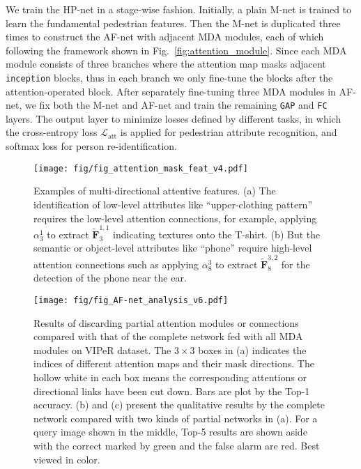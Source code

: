 \documentclass[10pt,twocolumn,letterpaper]{article}
\begin{document}
We train the HP-net in a stage-wise fashion.
Initially, a plain M-net is trained to learn the fundamental pedestrian features.
Then the M-net is duplicated three times to construct the AF-net with adjacent MDA modules, each of which following the framework shown in Fig.~\ref{fig:attention_module}.
Since each MDA module consists of three branches where the attention map masks adjacent \texttt{inception} blocks, thus in each branch we only fine-tune the blocks after the attention-operated block.
After separately fine-tuning three MDA modules in AF-net, we fix both the M-net and AF-net and train the remaining \texttt{GAP} and \texttt{FC} layers.
The output layer to minimize losses defined by different tasks, in which the cross-entropy loss $\mathcal{L}_\text{att}$ is applied for pedestrian attribute recognition, and softmax loss for person re-identification.






\begin{figure}[t]
\centering
\texttt{[image: fig/fig\_attention\_mask\_feat\_v4.pdf]}
\caption{
Examples of multi-directional attentive features.
(a) The identification of low-level attributes like ``upper-clothing pattern'' requires the low-level attention connections, for example, applying $\alpha^1_3$ to extract $\tilde{\mathbf{F}}^{1,1}_3$ indicating textures onto the T-shirt. (b) But the semantic or object-level attributes like ``phone'' require high-level attention connections such as applying $\alpha^3_8$ to extract $\tilde{\mathbf{F}}^{3,2}_8$ for the detection of the phone near the ear.
}
\label{fig:attention_mask_feat}
\end{figure}




\begin{figure*}[t]
\centering
\texttt{[image: fig/fig\_AF-net\_analysis\_v6.pdf]}
\caption{Results of discarding partial attention modules or connections compared with that of the complete network fed with all MDA modules on VIPeR dataset. The $3\times 3$ boxes in (a) indicates the indices of different attention maps and their mask directions. The hollow white in each box means the corresponding attentions or directional links have been cut down. Bars are plot by the Top-1 accuracy. (b) and (c) present the qualitative results by the complete network compared with two kinds of partial networks in (a). For a query image shown in the middle, Top-5 results are shown aside with the correct marked by green and the false alarm are red. Best viewed in color.
}
\label{fig:AF-net_analysis}
\end{figure*}
\end{document}

